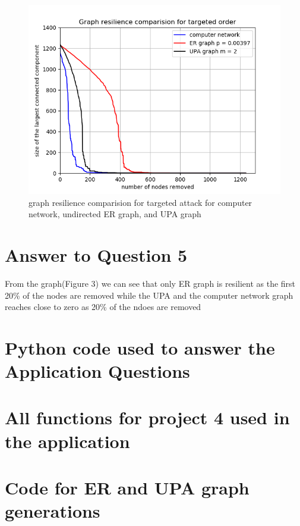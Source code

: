 \documentclass[a4paper]{article}
\begin{document}
\FloatBarrier
\begin{figure}[h]
	\centering 
	\includegraphics[scale = 1.0, clip=false, trim=0cm 0cm 0cm 0cm]{Q4_graph_resilience_comparision.png}
	\caption{graph resilience comparision for targeted attack for computer network, undirected ER graph, and UPA graph}
\end{figure}
\FloatBarrier

\section*{Answer to Question 5}
From the graph(Figure 3) we can see that only ER graph is resilient as the first 20\% of the nodes are removed while the UPA and the computer network graph reaches close to zero as 20\% of the ndoes are removed
 
\newpage

\appendix
\section{Python code used to answer the Application Questions}

\section{All functions for project 4 used in the application}

\section{Code for ER and UPA graph generations}

\end{document}
